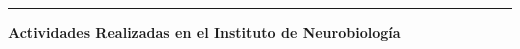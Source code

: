 \documentclass[12pt]{article}
\begin{document}
\rule{\textwidth}{1.0pt}

{\large \textbf{Actividades Realizadas en el Instituto de Neurobiología}}

%

%

%

%

%

%

%

%

%

%

%

%

%

%

%

%


\end{document}
